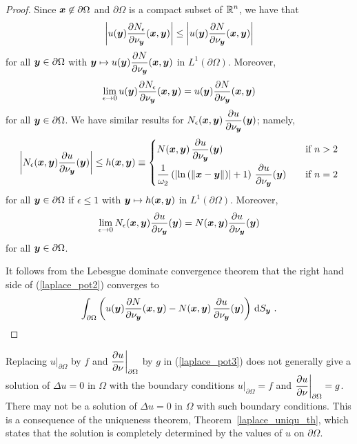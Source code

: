\begin{proof}
Since ${\bm{x}} \not\in \partial \Omega$ and $\partial \Omega$ is a
compact subset of $\displaystyle \mathbb{R}^n$, we have that
\[
\left| u({\bm{y}})
\frac{\partial{N_{\epsilon}}}{\partial \nu_{{\bm{y}}}}({\bm{x}},{\bm{y}}) \right|
\leq \left| u({\bm{y}}) \frac{\partial{N}}{\partial \nu_{{\bm{y}}}}({\bm{x}},{\bm{y}}) \right|
\]
for all ${\bm{y}} \in \partial \Omega$ with
$\displaystyle {\bm{y}}\mapsto u({\bm{y}})
\frac{\partial{N}}{\partial \nu_{{\bm{y}}}}({\bm{x}},{\bm{y}})$ in
$\displaystyle L^1(\partial \Omega)$.
Moreover,
\[
\lim_{\epsilon \rightarrow 0}
u({\bm{y}}) \frac{\partial{N_{\epsilon}}}{\partial \nu_{{\bm{y}}}}({\bm{x}},{\bm{y}})
= u({\bm{y}}) \frac{\partial{N}}{\partial \nu_{{\bm{y}}}}({\bm{x}},{\bm{y}})
\]
for all ${\bm{y}} \in \partial \Omega$.  We have similar results for 
$\displaystyle N_{\epsilon}({\bm{x}},{\bm{y}})
\, \frac{\partial{u}}{\partial \nu_{{\bm{y}}}}({\bm{y}})$; namely,
\[
\left| N_{\epsilon}({\bm{x}},{\bm{y}})
\frac{\partial{u}}{\partial \nu_{{\bm{y}}}}({\bm{y}}) \right|
\leq h({\bm{x}},{\bm{y}})
\equiv
\begin{cases}
\displaystyle N({\bm{x}},{\bm{y}})
\, \frac{\partial{u}}{\partial \nu_{{\bm{y}}}}({\bm{y}}) & \quad \text{if} \ n > 2 \\[0.8em]
\displaystyle
\frac{1}{\omega_2} \left( \left|\ln\left(\|{\bm{x}}- {\bm{y}}\|\right)\right|
+1 \right) \, \frac{\partial{u}}{\partial \nu_{{\bm{y}}}}({\bm{y}}) & \quad
\text{if} \ n = 2
\end{cases}
\]
for all ${\bm{y}} \in \partial \Omega$ if $\epsilon \leq 1$ with
$\displaystyle {\bm{y}}\mapsto h({\bm{x}},{\bm{y}})$ in
$\displaystyle L^1(\partial \Omega)$.
Moreover,
\[
\lim_{\epsilon \rightarrow 0}
N_{\epsilon}({\bm{x}},{\bm{y}})
\frac{\partial{u}}{\partial \nu_{{\bm{y}}}}({\bm{y}})
= N({\bm{x}},{\bm{y}})
\frac{\partial{u}}{\partial \nu_{{\bm{y}}}}({\bm{y}})
\]
for all ${\bm{y}} \in \partial \Omega$.

It follows from the Lebesgue dominate convergence theorem that the
right hand side of (\ref{laplace_pot2}) converges to
\[
\int_{\partial \Omega} \left( u({\bm{y}})
\frac{\partial{N}}{\partial \nu_{{\bm{y}}}}({\bm{x}},{\bm{y}}) - N({\bm{x}},{\bm{y}}) \,
\frac{\partial{u}}{\partial \nu_{{\bm{y}}}}({\bm{y}})\right) \,\mathrm{d}{S}_{{\bm{y}}} \ .
\]
\end{proof}

\begin{rmk}
Replacing $\displaystyle u\big|_{\partial \Omega}$ by $f$ and
$\displaystyle \frac{\partial{u}}{\partial \nu}\bigg|_{\partial \Omega}$ by $g$
in (\ref{laplace_pot3}) does not generally give a solution of
$\Delta u = 0$ in $\Omega$ with the boundary conditions
$\displaystyle u\big|_{\partial \Omega} = f$ and
$\displaystyle \frac{\partial{u}}{\partial \nu}\bigg|_{\partial \Omega} = g$.
There may not be a solution of $\Delta u = 0$ in $\Omega$ with such
boundary conditions.  This is a consequence of the uniqueness theorem,
Theorem~\ref{laplace_uniqu_th}, which states that the solution is
completely determined by the values of $u$ on $\partial \Omega$.
\end{rmk}


